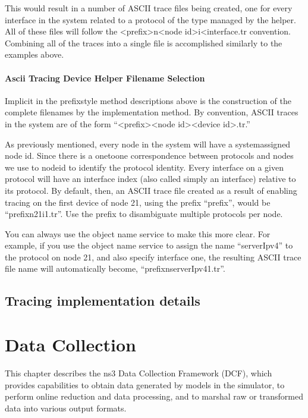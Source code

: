 \documentclass[letterpaper,10pt,english]{sphinxmanual}
\begin{document}
This would result in a number of ASCII trace files being created, one for
every interface in the system related to a protocol of the type managed by the
helper. All of these files will follow the \textless{}prefix\textgreater{}\sphinxhyphen{}n\textless{}node id\textgreater{}\sphinxhyphen{}i\textless{}interface.tr
convention. Combining all of the traces into a single file is accomplished
similarly to the examples above.


\subsubsection{Ascii Tracing Device Helper Filename Selection}
\label{\detokenize{tracing:id2}}
Implicit in the prefix\sphinxhyphen{}style method descriptions above is the construction of
the complete filenames by the implementation method. By convention, ASCII traces
in the  system are of the form “\textless{}prefix\textgreater{}\sphinxhyphen{}\textless{}node id\textgreater{}\sphinxhyphen{}\textless{}device id\textgreater{}.tr.”

As previously mentioned, every node in the system will have a system\sphinxhyphen{}assigned
node id. Since there is a one\sphinxhyphen{}to\sphinxhyphen{}one correspondence between protocols and nodes
we use to node\sphinxhyphen{}id to identify the protocol identity. Every interface on a given
protocol will have an interface index (also called simply an interface) relative
to its protocol. By default, then, an ASCII trace file created as a result of
enabling tracing on the first device of node 21, using the prefix “prefix”,
would be “prefix\sphinxhyphen{}n21\sphinxhyphen{}i1.tr”. Use the prefix to disambiguate multiple protocols
per node.

You can always use the  object name service to make this more clear.
For example, if you use the object name service to assign the name “serverIpv4”
to the protocol on node 21, and also specify interface one, the resulting ASCII
trace file name will automatically become, “prefix\sphinxhyphen{}nserverIpv4\sphinxhyphen{}1.tr”.


\section{Tracing implementation details}
\label{\detokenize{tracing:tracing-implementation-details}}

\chapter{Data Collection}
\label{\detokenize{data-collection:data-collection}}\label{\detokenize{data-collection::doc}}
This chapter describes the ns\sphinxhyphen{}3 Data Collection Framework (DCF), which
provides capabilities to obtain data generated by models in the simulator,
to perform on\sphinxhyphen{}line reduction and data processing, and to marshal raw
or transformed data into various output formats.
\end{document}
